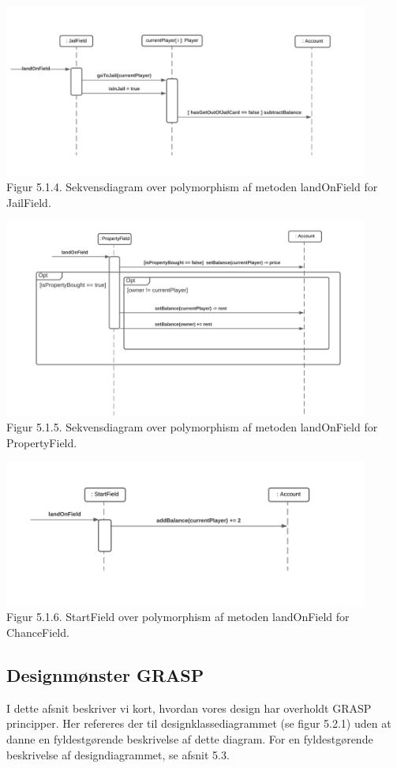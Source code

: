 \begin{flushleft}
\includegraphics[width=0.9\textwidth]{Report/figures/Sekvensdiagram_JailField.png}~\\[0cm]
Figur 5.1.4. Sekvensdiagram over polymorphism af metoden landOnField for JailField.


\includegraphics[width=0.9\textwidth]{Report/figures/Sekvensdiagram_PropertyField.png}~\\[0cm]
Figur 5.1.5. Sekvensdiagram over polymorphism af metoden landOnField for PropertyField.


\includegraphics[width=0.9\textwidth]{Report/figures/Sekvensdiagram_StartField.png}~\\[0cm]
Figur 5.1.6. StartField over polymorphism af metoden landOnField for ChanceField.
\subsection{Designmønster GRASP}
I dette afsnit beskriver vi kort, hvordan vores design har overholdt GRASP principper. Her refereres der til designklassediagrammet (se figur 5.2.1) uden at danne en fyldestgørende beskrivelse af dette diagram. For en fyldestgørende beskrivelse af designdiagrammet, se afsnit 5.3.

\end{flushleft}
